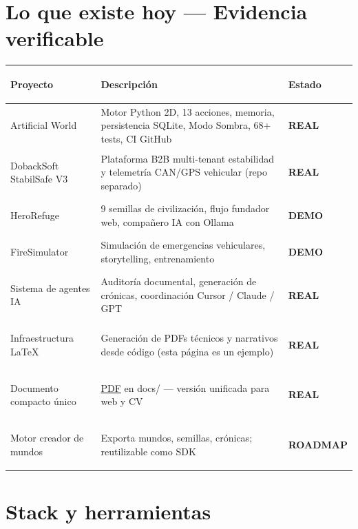 \documentclass[10pt,a4paper]{article}
\newcommand{\badge}[2][accent]{%
  \colorbox{#1!15}{\small\color{#1}\textbf{#2}}%
}
\newcommand{\real}{\badge[green]{REAL}}
\newcommand{\demo}{\badge[warn]{DEMO}}
\newcommand{\roadmap}{\badge[muted]{ROADMAP}}
\begin{document}
\section{Lo que existe hoy --- Evidencia verificable}

\begin{tabularx}{\linewidth}{>{\bfseries\raggedright\arraybackslash}p{3.8cm} X >{\centering\arraybackslash}p{1.9cm}}
  \toprule
  Proyecto & Descripci\'on & Estado \\
  \midrule
  Artificial World &
    Motor Python 2D, 13 acciones, memoria, persistencia SQLite,
    Modo Sombra, 68+ tests, CI GitHub & \real \\[3pt]
  DobackSoft StabilSafe V3 &
    Plataforma B2B multi-tenant estabilidad y telemetr\'ia CAN/GPS
    vehicular (repo separado) & \real \\[3pt]
  HeroRefuge &
    9 semillas de civilizaci\'on, flujo fundador web,
    compa\~nero IA con Ollama & \demo \\[3pt]
  FireSimulator &
    Simulaci\'on de emergencias vehiculares,
    storytelling, entrenamiento & \demo \\[3pt]
  Sistema de agentes IA &
    Auditor\'ia documental, generaci\'on de cr\'onicas,
    coordinaci\'on Cursor / Claude / GPT & \real \\[3pt]
  Infraestructura \LaTeX{} &
    Generaci\'on de PDFs t\'ecnicos y narrativos desde c\'odigo
    (esta p\'agina es un ejemplo) & \real \\[3pt]
  Documento compacto \'unico &
    \href{ARTIFICIAL_WORLD_COMPACTO_UNICO.pdf}{PDF} en docs/ ---
    versi\'on unificada para web y CV & \real \\[3pt]
  Motor creador de mundos &
    Exporta mundos, semillas, cr\'onicas;
    reutilizable como SDK & \roadmap \\
  \bottomrule
\end{tabularx}

\section{Stack y herramientas}
\end{document}
